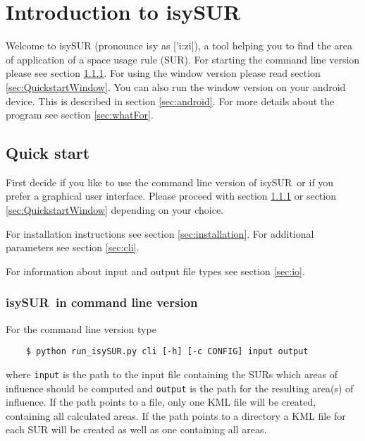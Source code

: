 \documentclass[11pt,fleqn]{book} %
\newcommand{\ProjectTitle}{isySUR}
\newcommand{\pt}{\ProjectTitle}
\begin{document}

\pagestyle{empty} %

\setcounter{tocdepth}{3}
\tableofcontents %

\cleardoublepage %

\pagestyle{fancy} %


\chapter{Introduction to \ProjectTitle}
Welcome to isySUR (pronounce isy as ['i:zi]), a tool helping you to find the area of application of a space usage rule (SUR). For starting the command line version please see section \ref{sec:QuickstartTerminal}. For using the window version please read section \ref{sec:QuickstartWindow}. You can also run the window version on your android device. This is described in section \ref{sec:android}. For more details about the program see section \ref{sec:whatFor}.

\section{Quick start}
First decide if you like to use the command line version of \pt\ or if you prefer a graphical user interface. Please proceed with section \ref{sec:QuickstartTerminal} or section \ref{sec:QuickstartWindow} depending on your choice.

For installation instructions see section \ref{sec:installation}. For additional parameters see section \ref{sec:cli}.

For information about input and output file types see section \ref{sec:io}.

\subsection{\ProjectTitle\ in command line version}\label{sec:QuickstartTerminal}
For the command line version type
\begin{verbatim}
	$ python run_isySUR.py cli [-h] [-c CONFIG] input output
\end{verbatim}
where \texttt{input} is the path to the input file containing the SURs which areas of influence should be computed and \texttt{output} is the path for the resulting area(s) of influence. If the path points to a file, only one KML file will be created, containing all calculated areas. If the path points to a directory a KML file for each SUR will be created as well as one containing all areas.
\end{document}
